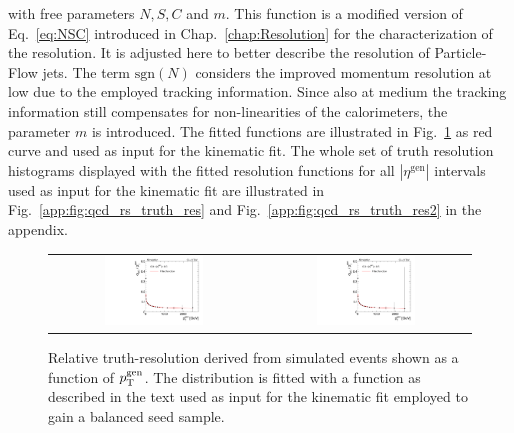 with free parameters $N, S, C$ and $m$. This function is a modified version of Eq.~\ref{eq:NSC} introduced in Chap.~\ref{chap:Resolution} for the characterization of the resolution. It is adjusted here to better describe the resolution of Particle-Flow jets. The term $\mathrm{sgn}(N)$ considers the improved momentum resolution at low \pt due to the employed tracking information. Since also at medium \pt the tracking information still compensates for non-linearities of the calorimeters, the parameter $m$ is introduced. The fitted functions are illustrated in Fig.~\ref{fig:qcd_rs_truth_res} as red curve and used as input for the kinematic fit. The whole set of truth resolution histograms displayed with the fitted resolution functions for all $|\eta^\mathrm{gen}|$ intervals used as input for the kinematic fit are illustrated in Fig.~\ref{app:fig:qcd_rs_truth_res} and Fig.~\ref{app:fig:qcd_rs_truth_res2} in the appendix. 
\begin{figure}[!t]
  \centering
  \begin{tabular}{cc}
                \includegraphics[width=0.49\textwidth]{figures/TruthRes_Eta0.pdf} &
                \includegraphics[width=0.49\textwidth]{figures/TruthRes_Eta1.pdf} 
  \end{tabular}
  \caption{Relative truth-\pt resolution derived from simulated events shown as a function of $p_{\text{T}}^\mathrm{gen}$. The distribution is fitted with a function as described in the text used as input for the kinematic fit employed to gain a balanced seed sample.}
  \label{fig:qcd_rs_truth_res}
\end{figure}
\\
